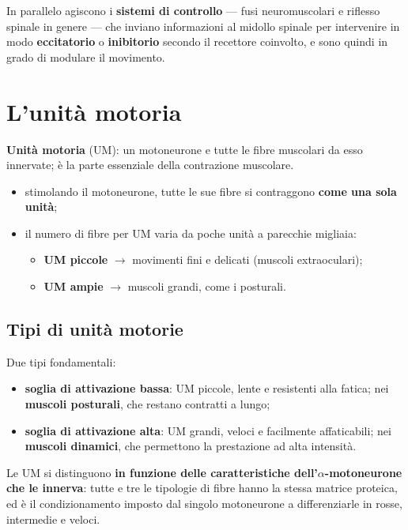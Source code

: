 In parallelo agiscono i \textbf{sistemi di controllo} --- fusi neuromuscolari e riflesso spinale
in genere --- che inviano informazioni al midollo spinale per intervenire in modo
\textbf{eccitatorio} o \textbf{inibitorio} secondo il recettore coinvolto, e sono quindi in grado
di modulare il movimento.

\section{L'unità motoria}

\textbf{Unità motoria} (UM): un motoneurone e tutte le fibre muscolari da esso innervate; è la
parte essenziale della contrazione muscolare.

\begin{itemize}
  \item stimolando il motoneurone, tutte le sue fibre si contraggono \textbf{come una sola
    unità};
  \item il numero di fibre per UM varia da poche unità a parecchie migliaia:
    \begin{itemize}
      \item \textbf{UM piccole} $\rightarrow$ movimenti fini e delicati (muscoli extraoculari);
      \item \textbf{UM ampie} $\rightarrow$ muscoli grandi, come i posturali.
    \end{itemize}
\end{itemize}

\subsection{Tipi di unità motorie}

Due tipi fondamentali:
\begin{itemize}
  \item \textbf{soglia di attivazione bassa}: UM piccole, lente e resistenti alla fatica; nei
    \textbf{muscoli posturali}, che restano contratti a lungo;
  \item \textbf{soglia di attivazione alta}: UM grandi, veloci e facilmente affaticabili; nei
    \textbf{muscoli dinamici}, che permettono la prestazione ad alta intensità.
\end{itemize}

Le UM si distinguono \textbf{in funzione delle caratteristiche dell'$\alpha$-motoneurone che le
innerva}: tutte e tre le tipologie di fibre hanno la stessa matrice proteica, ed è il
condizionamento imposto dal singolo motoneurone a differenziarle in rosse, intermedie e veloci.

